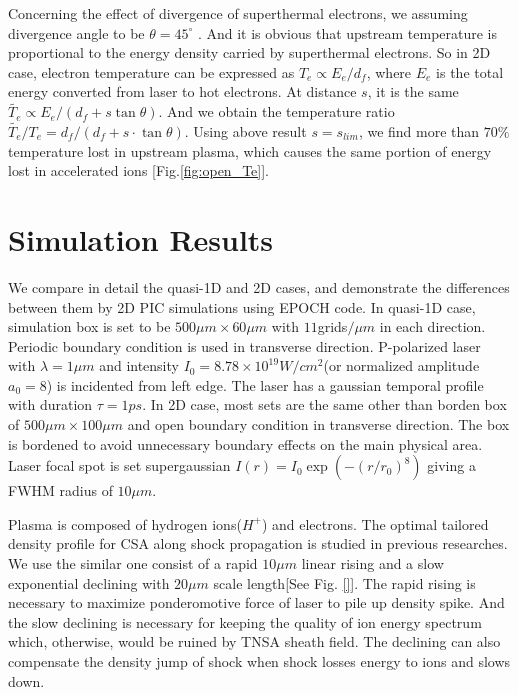 \documentclass[12pt]{iopart}
\begin{document}
Concerning the effect of divergence of superthermal electrons, we assuming divergence angle to be $\theta=45^\circ$  \cite{gibbon_short_2005}. And it is obvious that upstream temperature is proportional to the energy density carried by superthermal electrons. So in 2D case, electron temperature can be expressed as $T_e\propto E_e/d_f$, where $E_e$ is the total energy converted from laser to hot electrons. At distance $s$, it is the same $\tilde{T_e} \propto E_e/(d_f+s\tan{\theta})$. And we obtain the temperature ratio $\tilde{T_e}/T_e=d_f/(d_f+s\cdot\tan{\theta})$. Using above result $s=s_{lim}$, we find more than $70\%$ temperature lost in upstream plasma, which causes the same portion of energy lost in accelerated ions [Fig.\ref{fig:open_Te}].

\section{Simulation Results}
\label{simulation}
We compare in detail the quasi-1D and 2D cases, and demonstrate the differences between them by 2D PIC simulations using EPOCH code\cite{}. In quasi-1D case, simulation box is set to be $500\mu m \times 60\mu m$ with $11$grids$/\mu m$ in each direction. Periodic boundary condition is used in transverse direction. P-polarized laser with $\lambda=1\mu m$ and intensity $I_0=8.78\times 10^{19}W/cm^2$(or normalized amplitude $a_0 = 8$) is incidented from left edge. The laser has a gaussian temporal profile with duration $\tau=1ps$. In 2D case, most sets are the same other than borden box of $500\mu m \times 100\mu m$ and open boundary condition in transverse direction. The box is bordened to avoid unnecessary boundary effects on the main physical area. Laser focal spot is set supergaussian $I(r)=I_0\exp(-(r/r_0)^8)$ giving a FWHM radius of $10\mu m$.

Plasma is composed of hydrogen ions($H^+$) and electrons. The optimal tailored density profile for CSA along shock propagation is studied in previous researches\cite{fiuza_ion_2013,fiuza_laser-driven_2012,boella_numerical_2017}. We use the similar one consist of a rapid $10\mu m$ linear rising and a slow exponential declining with $20\mu m$ scale length[See Fig. \ref{}]. The rapid rising is necessary to maximize ponderomotive force of laser to pile up density spike. And the slow declining is necessary for keeping the quality of ion energy spectrum which, otherwise, would be ruined by TNSA sheath field. The declining can also compensate the density jump  of shock when shock losses energy to ions and slows down\cite{macchi_solitary_2012}. 
\end{document}
